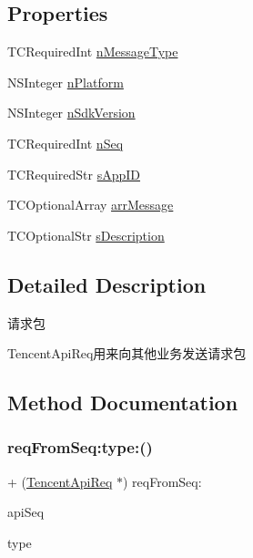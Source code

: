 \subsection*{Properties}
\begin{DoxyCompactItemize}
\item 
T\+C\+Required\+Int \mbox{\hyperlink{interface_tencent_api_req_a92df264f6ffe96db9c3031991c99070d}{n\+Message\+Type}}
\item 
N\+S\+Integer \mbox{\hyperlink{interface_tencent_api_req_ac063480068312580107509479ca6ff78}{n\+Platform}}
\item 
N\+S\+Integer \mbox{\hyperlink{interface_tencent_api_req_a231ee69395d097c96df3ff395a56eda7}{n\+Sdk\+Version}}
\item 
T\+C\+Required\+Int \mbox{\hyperlink{interface_tencent_api_req_a94284ae9d2dfef823004d68e443c296f}{n\+Seq}}
\item 
T\+C\+Required\+Str \mbox{\hyperlink{interface_tencent_api_req_a7c67c89447a66af8f7f3087277cc8e49}{s\+App\+ID}}
\item 
T\+C\+Optional\+Array \mbox{\hyperlink{interface_tencent_api_req_a6585a0dabcd262c39da97b75af1556dc}{arr\+Message}}
\item 
T\+C\+Optional\+Str \mbox{\hyperlink{interface_tencent_api_req_a6dabf04ecc537c1f4d23691cdb499649}{s\+Description}}
\end{DoxyCompactItemize}


\subsection{Detailed Description}
请求包 

Tencent\+Api\+Req用来向其他业务发送请求包 

\subsection{Method Documentation}
\mbox{\label{interface_tencent_api_req_ae0301f606ff6da9edd28298b1f59df10}} 
\subsubsection{\texorpdfstring{req\+From\+Seq\+:type\+:()}{reqFromSeq:type:()}\hspace{0.1cm}{\footnotesize\ttfamily [1/2]}}
{\footnotesize\ttfamily + (\mbox{\hyperlink{interface_tencent_api_req}{Tencent\+Api\+Req}} $\ast$) req\+From\+Seq\+: \begin{DoxyParamCaption}\item[{(N\+S\+Integer)}]{api\+Seq }\item[{type:(Tencent\+Req\+Message\+Type)}]{type }\end{DoxyParamCaption}}

